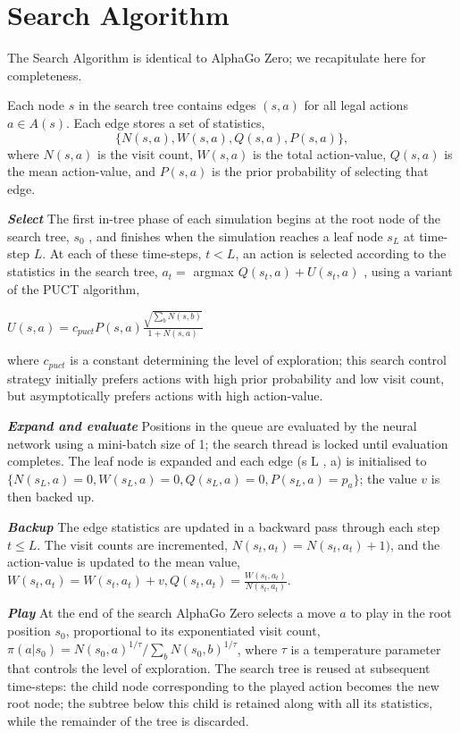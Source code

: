 \documentclass[12pt,a4paper]{report}
\begin{document}
\section{Search Algorithm}
\hspace{0.6cm}The Search Algorithm is identical to AlphaGo Zero\cite{AlphaGoZero}; we recapitulate here for completeness.\par 
Each node \(s\) in the search tree contains edges \((s, a)\) for all legal actions \(a \in A(s)\). Each edge stores a set of statistics, \[\{N(s, a), W(s, a), Q(s, a), P(s, a)\},\] where \(N(s, a)\) is the visit count, \(W(s, a)\) is the total action-value, \(Q(s, a)\) is the mean action-value, and \(P(s, a)\) is the prior probability of selecting that edge. \par
\hspace{0.6cm}\textit{\textbf{Select}} The first in-tree phase of each simulation begins at the root node of the search tree, \(s_0\) , and finishes when the simulation reaches a leaf node \(s_L\) at time-step \(L\). At each of these time-steps, \(t < L\), an action is selected according to the statistics in the search tree, \(a_t =\) argmax \(Q(s_t, a) + U (s_t , a)\) , using a variant of the PUCT algorithm, 
\begin{center}\(U(s,a) = c_{puct}P(s,a)\frac{\sqrt{\sum_b N(s,b)}}{1+N(s,a)} \)\end{center}\par
where \(c_{puct}\) is a constant determining the level of exploration; this search control strategy initially prefers actions with high prior probability and low visit count, but asymptotically prefers actions with high action-value.\par
\textit{\textbf{Expand and evaluate}} Positions in the queue are evaluated by the neural network using a mini-batch size of 1; the search thread is locked until evaluation completes. The leaf node is expanded and each edge (s L , a) is initialised to \(\{N(s_L, a) = 0, W(s_L , a) = 0, Q(s_L , a) = 0, P (s_L , a) = p_a \}\); the value \(v\) is then backed up.\par
\textit{\textbf{Backup}} The edge statistics are updated in a backward pass through each step \(t \leq L\). The visit counts are incremented, \(N(s_t , a_t ) = N(s_t , a_t ) + 1)\), and the action-value is updated to the mean value, \(W(s_t , a_t ) = W(s_t , a_t) + v, Q(s_t , a_t) =\frac{W(s_t ,a_t)}{N(s_t ,a_t)}\).\par
\textit{\textbf{Play}} At the end of the search AlphaGo Zero selects a move \(a\) to play in the root position \(s_0\), proportional to its exponentiated visit count, \(\pi(a|s_0 ) = N(s_0,a)^{1/\tau} /\sum_b N (s_0 , b)^{1/\tau}\), where \(\tau\) is a temperature parameter that controls the level of exploration. The search tree is reused at subsequent time-steps: the child node corresponding to the played action becomes the new root node; the subtree below this child is retained along with all its statistics, while the remainder of the tree is discarded.
\end{document}
